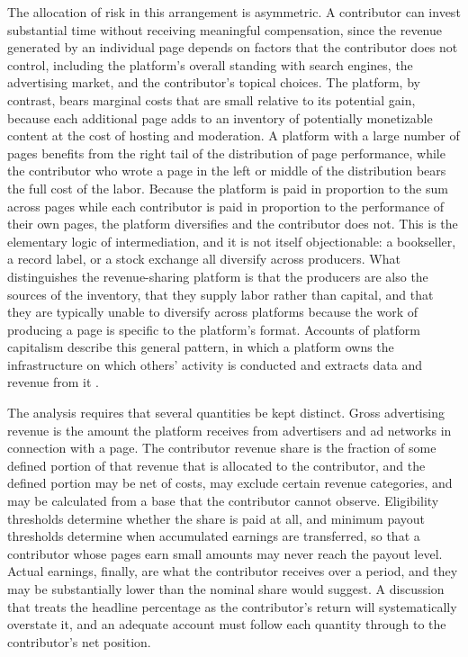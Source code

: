 \documentclass[11pt]{article}
\theoremstyle{remark}
\begin{document}
The allocation of risk in this arrangement is asymmetric. A contributor can invest substantial time without receiving meaningful compensation, since the revenue generated by an individual page depends on factors that the contributor does not control, including the platform's overall standing with search engines, the advertising market, and the contributor's topical choices. The platform, by contrast, bears marginal costs that are small relative to its potential gain, because each additional page adds to an inventory of potentially monetizable content at the cost of hosting and moderation. A platform with a large number of pages benefits from the right tail of the distribution of page performance, while the contributor who wrote a page in the left or middle of the distribution bears the full cost of the labor. Because the platform is paid in proportion to the sum across pages while each contributor is paid in proportion to the performance of their own pages, the platform diversifies and the contributor does not. This is the elementary logic of intermediation, and it is not itself objectionable: a bookseller, a record label, or a stock exchange all diversify across producers. What distinguishes the revenue-sharing platform is that the producers are also the sources of the inventory, that they supply labor rather than capital, and that they are typically unable to diversify across platforms because the work of producing a page is specific to the platform's format. Accounts of platform capitalism describe this general pattern, in which a platform owns the infrastructure on which others' activity is conducted and extracts data and revenue from it \cite{srnicek2016}.

The analysis requires that several quantities be kept distinct. Gross advertising revenue is the amount the platform receives from advertisers and ad networks in connection with a page. The contributor revenue share is the fraction of some defined portion of that revenue that is allocated to the contributor, and the defined portion may be net of costs, may exclude certain revenue categories, and may be calculated from a base that the contributor cannot observe. Eligibility thresholds determine whether the share is paid at all, and minimum payout thresholds determine when accumulated earnings are transferred, so that a contributor whose pages earn small amounts may never reach the payout level. Actual earnings, finally, are what the contributor receives over a period, and they may be substantially lower than the nominal share would suggest. A discussion that treats the headline percentage as the contributor's return will systematically overstate it, and an adequate account must follow each quantity through to the contributor's net position.
\end{document}
